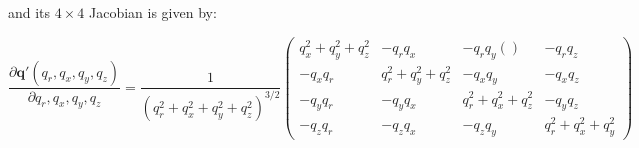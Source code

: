\documentclass[a4paper,10pt]{report}
\begin{document}
\noindent and its $4 \times 4$ Jacobian is given by:

\begin{equation}
\frac{\partial \mathbf{q'}(q_r,q_x,q_y,q_z)}{\partial q_r,q_x,q_y,q_z}  
=
\frac{1}{(q_r^2+q_x^2+q_y^2+q_z^2)^{3/2}}
\left( 
\begin{array}{cccc}
q_x^2 +q_y^2+q_z^2  & -q_r q_x   & -q_r q_y()  & -q_r q_z  \\
-q_x q_r & q_r^2 +q_y^2+q_z^2 & -q_x q_y & - q_x q_z \\
-q_y q_r & -q_y q_x &  q_r^2 +q_x^2 +q_z^2 & -q_y q_z \\
-q_z q_r  & -q_z q_x & -q_z q_y  &  q_r^2+q_x^2+q_y^2
\end{array}
\right)
\end{equation}




\end{document}
